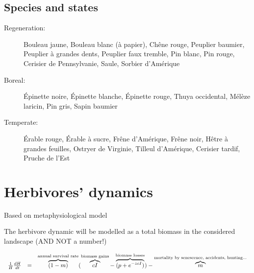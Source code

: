 \vspace{1em}


\subsection*{Species and states}

\begin{description}
\item[Regeneration: ] Bouleau jaune, Bouleau blanc (à papier), Chêne rouge, Peuplier baumier, Peuplier à grandes dents, Peuplier faux tremble, Pin blanc, Pin rouge, Cerisier de Pennsylvanie, Saule, Sorbier d'Amérique
\item[Boreal: ] Épinette noire, Épinette blanche, Épinette rouge, Thuya occidental, Mélèze laricin, Pin gris, Sapin baumier
\item[Temperate: ] Érable rouge, Érable à sucre, Frêne d'Amérique, Frêne noir, Hêtre à grandes feuilles, Ostryer de Virginie, Tilleul d'Amérique, Cerisier tardif, Pruche de l'Est
\end{description}



\newpage
\section{Herbivores' dynamics}

Based on metaphysiological model \cite{Owen-Smith2002}

The herbivore dynamic will be modelled as a total biomass in the considered
landscape (AND NOT a number!)

\[
\left.
\begin{array}{r c l}{}

\frac{1}{H}\frac{dH}{dt} &=& 
\overbrace{(1-m)}^\text{annual survival rate}
(\overbrace{cI}^\text{biomass gains} - \overbrace{(p+e^{-zcI})}^\text{biomass losses})
- \overbrace{m}^\text{mortality by senescence, accidents, hunting...}

\end{array}
\right.
\]

